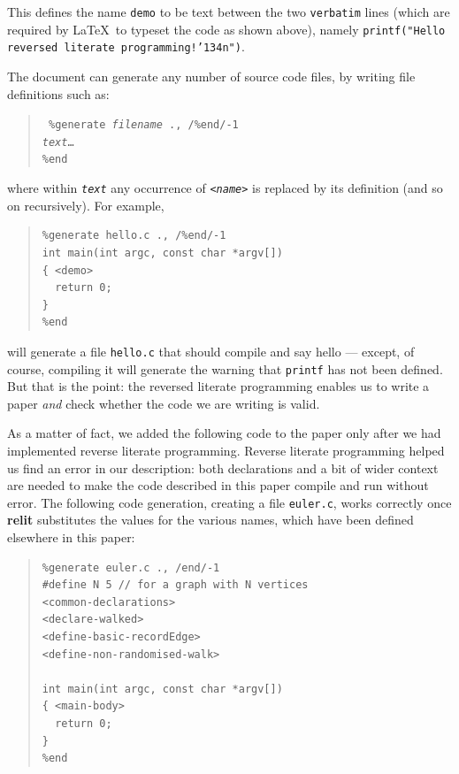 \documentclass[12pt]{article}
\def\name#1{\textbf{#1}}
\begin{document}
This defines the name \texttt{demo} to be text between the two \texttt{verbatim} lines (which are required by \LaTeX\ to typeset the code as shown above), namely \texttt{printf("Hello reversed literate programming!\char'134n")}.

The document can generate any number of source code files, by writing file definitions such as:

\begin{verse}\tt
\%{}generate \emph{filename} ., /\%end/-1\\
\emph{text}\ldots\\
\%end
\end{verse}

where within \texttt{\emph{text}} any occurrence of \texttt{<\emph{name}>} is replaced by its definition (and so on recursively). For example,

\begin{quote}\begin{verbatim}
%generate hello.c ., /%end/-1
int main(int argc, const char *argv[])
{ <demo>
  return 0;
}
%end
\end{verbatim}\end{quote}

will generate a file \texttt{hello.c} that should compile and say hello --- except, of course, compiling it will generate the warning that \texttt{printf} has not been defined. But that is the point: the reversed literate programming enables us to write a paper \emph{and\/} check whether the code we are writing is valid. 

As a matter of fact, we added the following code to the paper only after we had implemented reverse literate programming. Reverse literate programming helped us find an error in our description: both declarations and a bit of wider context are needed to make the code described in this paper compile and run without error. The following code generation, creating a file \texttt{euler.c}, works correctly once \name{relit} substitutes the values for the various names, which have been defined elsewhere in this paper:

\begin{quote}\begin{verbatim}
%generate euler.c ., /end/-1
#define N 5 // for a graph with N vertices
<common-declarations>
<declare-walked>
<define-basic-recordEdge>
<define-non-randomised-walk>

int main(int argc, const char *argv[])
{ <main-body>
  return 0;
}
%end
\end{verbatim}\end{quote}
\end{document}
